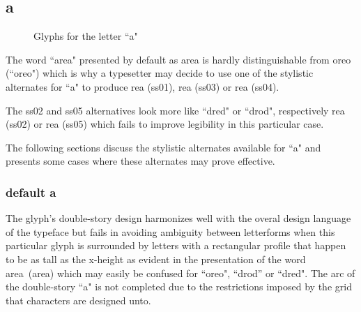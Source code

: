 \subsection{a}

\begin{figure}[!h]
  \caption{Glyphs for the letter ``a"}
  \label{fig:glyphs-a}
  \centering
\end{figure}
The word ``area" presented by default as {\ssdefault area} is hardly
distinguishable from {\ssdefault oreo} (``oreo") which is why a typesetter may
decide to use one of the stylistic alternates for ``a" to produce
{re{\ssone a}} (ss01),
{re{\ssthree a}} (ss03) or
{re{\ssfour a}} (ss04).

The ss02 and ss05 alternatives look more like ``dred" or ``drod", respectively
{re{\sstwo a}} (ss02) or
{re{\ssfive a}} (ss05)
which fails to improve legibility in this particular case.

The following sections discuss the stylistic alternates available for ``a" and
presents some cases where these alternates may prove effective.

\subsubsection{default {\ssdefault a}}

The glyph's double-story design harmonizes well with the overal design
language of the typeface but fails in avoiding ambiguity between letterforms
when this particular glyph is surrounded by letters with a rectangular profile
that happen to be as tall as the x-height as evident in the presentation of the
word \mbox{{\ssdefault area} (area)} which may easily be confused for ``oreo",
``drod'' or ``dred". The arc of the double-story ``a" is not completed due to
the restrictions imposed by the grid that characters are designed unto.

